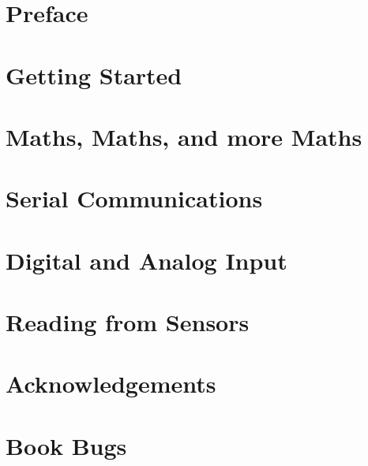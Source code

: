 \documentclass[a5paper,oneside]{scrbook}
\begin{document}
	



\tableofcontents

\chapter*{Preface\label{preface}}


\chapter{Getting Started\label{ch0}}




\chapter{Maths, Maths, and more Maths}

\chapter{Serial Communications}

\chapter{Digital and Analog Input}


\chapter{Reading from Sensors}


%

\chapter{Acknowledgements\label{acknowledgements}}


\chapter{Book Bugs\label{bugs}}

\end{document}
